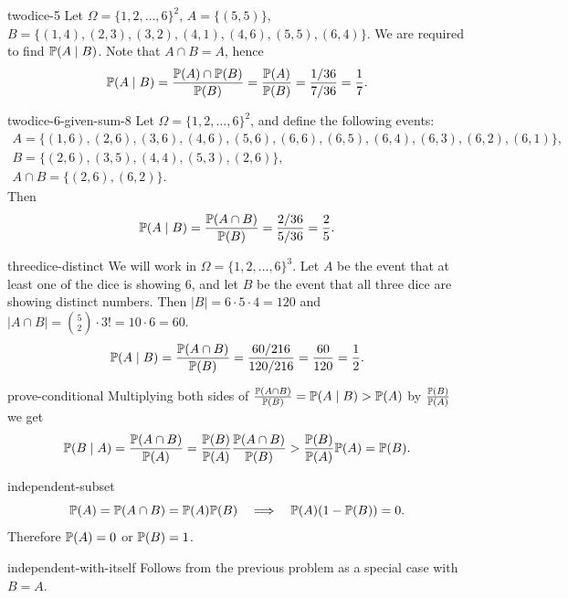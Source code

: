 \begin{sol}{twodice-5}
    Let $\Omega=\{1,2,\ldots,6\}^2$, $A=\{(5,5)\}$, $B=\{(1,4),(2,3),(3,2),(4,1),(4,6),(5,5),(6,4)\}$. We are required to find $\mathbb{P}(A\mid B)$. Note that $A\cap B=A$, hence
    \[
        \mathbb{P}(A\mid B)=\frac{\mathbb{P}(A)\cap\mathbb{P}(B)}{\mathbb{P}(B)}=\frac{\mathbb{P}(A)}{\mathbb{P}(B)}=\frac{1/36}{7/36}=\frac17.
    \]
\end{sol}

\begin{sol}{twodice-6-given-sum-8}
    Let $\Omega=\{1,2,\ldots,6\}^2$, and define the following events:
    \begin{gather*}
        A=\{(1,6),(2,6),(3,6),(4,6),(5,6),(6,6),(6,5),(6,4),(6,3),(6,2),(6,1)\}, \\
        B=\{(2,6),(3,5),(4,4),(5,3),(2,6)\}, \\
        A\cap B=\{(2,6),(6,2)\}.
    \end{gather*}
    Then
    \[
        \mathbb{P}(A\mid B)=\frac{\mathbb{P}(A\cap B)}{\mathbb{P}(B)}=\frac{2/36}{5/36}=\frac25.
    \]
\end{sol}

\begin{sol}{threedice-distinct}
    We will work in $\Omega=\{1,2,\ldots,6\}^3$. Let $A$ be the event that at least one of the dice is showing $6$, and let $B$ be the event that all three dice are showing distinct numbers. Then $|B|=6\cdot5\cdot4=120$ and $|A\cap B|=\binom{5}{2}\cdot3!=10\cdot6=60$.
    \[
        \mathbb{P}(A\mid B)=\frac{\mathbb{P}(A\cap B)}{\mathbb{P}(B)}=\frac{60/216}{120/216}=\frac{60}{120}=\frac12.
    \]
\end{sol}

\begin{sol}{prove-conditional}
    Multiplying both sides of $\frac{\mathbb{P}(A\cap B)}{\mathbb{P}(B)}=\mathbb{P}(A\mid B)>\mathbb{P}(A)$ by $\frac{\mathbb{P}(B)}{\mathbb{P}(A)}$ we get
    \[
        \mathbb{P}(B\mid A)=\frac{\mathbb{P}(A\cap B)}{\mathbb{P}(A)}=\frac{\mathbb{P}(B)}{\mathbb{P}(A)}\frac{\mathbb{P}(A\cap B)}{\mathbb{P}(B)}>\frac{\mathbb{P}(B)}{\mathbb{P}(A)}\mathbb{P}(A)=\mathbb{P}(B).
    \]
\end{sol}

\begin{sol}{independent-subset}
    \[
        \mathbb{P}(A)=\mathbb{P}(A\cap B)=\mathbb{P}(A)\mathbb{P}(B)\quad\Longrightarrow\quad \mathbb{P}(A)(1-\mathbb{P}(B))=0.
    \]
    Therefore $\mathbb{P}(A)=0$ or $\mathbb{P}(B)=1$.
\end{sol}

\begin{sol}{independent-with-itself}
    Follows from the previous problem as a special case with $B=A$.
\end{sol}

